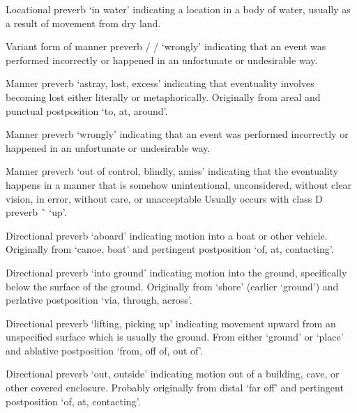 \begin{morphdesc}
\item[\X{héenx̱=}]
	Locational preverb ‘in water’ indicating a location in a body of water,
		usually as a result of movement from dry land.

\item[\X{ḵáaḵw=}]
\item[\X{ḵáaḵwt=}]
\item[\X{ḵáaḵwx̱=}]
	Variant form of manner preverb   /  /  ‘wrongly’
		indicating that an event was performed incorrectly
		or happened in an unfortunate or undesirable way.

\item[\X{ḵut=}]
	Manner preverb ‘astray, lost, excess’ indicating that eventuality involves becoming lost
		either literally or metaphorically.
	Originally from areal 
		and punctual postposition  ‘to, at, around’.

\item[\X{ḵwáaḵ=}]
\item[\X{ḵwáaḵt=}]
\item[\X{ḵwáaḵx̱=}]
	Manner preverb ‘wrongly’ indicating that an event was performed incorrectly
		or happened in an unfortunate or undesirable way.

\item[\X{ux̱=}]
\item[\X{úx̱=}]
	Manner preverb ‘out of control, blindly, amiss’
		indicating that the eventuality happens in a manner that is somehow unintentional,
		unconsidered, without clear vision, in error, without care, or unacceptable
	Usually occurs with class D preverb  \~\  ‘up’.

\item[\X{yaax̱=}]
	Directional preverb ‘aboard’ indicating motion into a boat or other vehicle.
	Originally from  ‘canoe, boat’
		and pertingent postposition  ‘of, at, contacting’.

\item[\X{ÿanax̱=}]
	Directional preverb ‘into ground’ indicating motion into the ground, specifically
		below the surface of the ground.
	Originally from  ‘shore’ (earlier ‘ground’)
		and perlative postposition  ‘via, through, across’.

\item[\X{yatx̱=}]
\item[\X{yetx̱=}]
\item[\X{yedax̱=}]
	Directional preverb ‘lifting, picking up’ indicating movement upward
		from an unspecified surface which is usually the ground.
	From either  ‘ground’ or  ‘place’
		and ablative postposition  ‘from, off of, out of’.

\item[\X{yux̱=}]
	Directional preverb ‘out, outside’ indicating motion out of a building, cave,
		or other covered enclosure.
	Probably originally from distal  ‘far off’
		and pertingent postposition  ‘of, at, contacting’.
\end{morphdesc}

